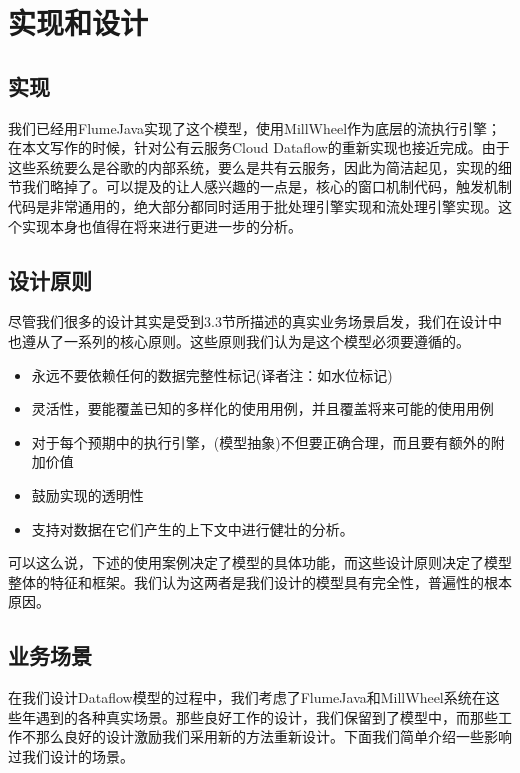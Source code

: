 \documentclass[oneside]{ctexbook}
\begin{document}
\section{实现和设计}

\subsection{实现}

我们已经用FlumeJava实现了这个模型，使用MillWheel作为底层的流执行引擎；在本文写作的时候，针对公有云服务Cloud Dataflow的重新实现也接近完成。由于这些系统要么是谷歌的内部系统，要么是共有云服务，因此为简洁起见，实现的细节我们略掉了。可以提及的让人感兴趣的一点是，核心的窗口机制代码，触发机制代码是非常通用的，绝大部分都同时适用于批处理引擎实现和流处理引擎实现。这个实现本身也值得在将来进行更进一步的分析。

\subsection{设计原则}

尽管我们很多的设计其实是受到3.3节所描述的真实业务场景启发，我们在设计中也遵从了一系列的核心原则。这些原则我们认为是这个模型必须要遵循的。

\begin{itemize}
\item 永远不要依赖任何的数据完整性标记(译者注：如水位标记)
\item 灵活性，要能覆盖已知的多样化的使用用例，并且覆盖将来可能的使用用例
\item 对于每个预期中的执行引擎，(模型抽象)不但要正确合理，而且要有额外的附加价值
\item 鼓励实现的透明性
\item 支持对数据在它们产生的上下文中进行健壮的分析。
\end{itemize}

可以这么说，下述的使用案例决定了模型的具体功能，而这些设计原则决定了模型整体的特征和框架。我们认为这两者是我们设计的模型具有完全性，普遍性的根本原因。

\subsection{业务场景}

在我们设计Dataflow模型的过程中，我们考虑了FlumeJava和MillWheel系统在这些年遇到的各种真实场景。那些良好工作的设计，我们保留到了模型中，而那些工作不那么良好的设计激励我们采用新的方法重新设计。下面我们简单介绍一些影响过我们设计的场景。
\end{document}
